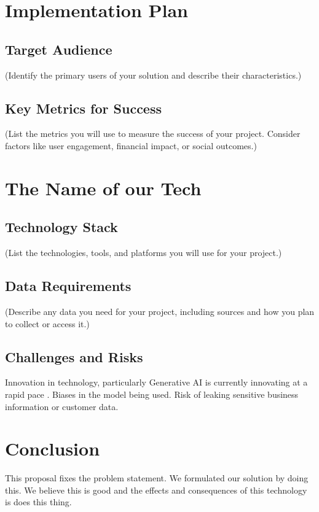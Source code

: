 \documentclass{article}
\begin{document}
\section{Implementation Plan}
\subsection{Target Audience}
(Identify the primary users of your solution and describe their characteristics.)
\subsection{Key Metrics for Success}
(List the metrics you will use to measure the success of your project. Consider factors like user engagement, financial impact, or social outcomes.)

\section{The Name of our Tech}
\subsection{Technology Stack}
(List the technologies, tools, and platforms you will use for your project.)
\subsection{Data Requirements}
(Describe any data you need for your project, including sources and how you plan to collect or access it.)

\subsection{Challenges and Risks}
Innovation in technology, particularly Generative AI is currently innovating at a rapid pace \parencite{weisz_design_2024}. Biases in the model being used. Risk of leaking sensitive business information or customer data.

\section{Conclusion}
This proposal fixes the problem statement. We formulated our solution by doing this. We believe this is good and the effects and consequences of this technology is does this thing.


\printbibliography
\end{document}
